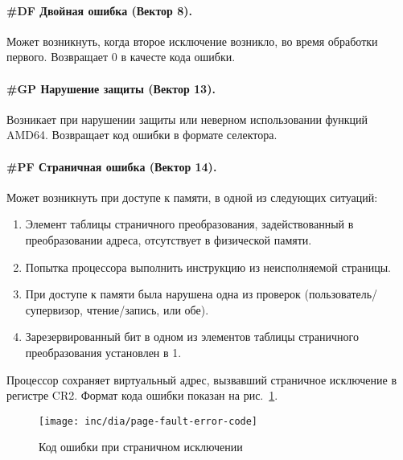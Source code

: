 \paragraph{\#DF Двойная ошибка (Вектор 8).}
Может возникнуть, когда второе исключение возникло, во время обработки
первого. Возвращает 0 в качесте кода ошибки.

\paragraph{\#GP Нарушение защиты (Вектор 13).}
Возникает при нарушении защиты или неверном использовании функций AMD64.
Возвращает код ошибки в формате селектора.

\paragraph{\#PF Страничная ошибка (Вектор 14).}
Может возникнуть при доступе к памяти, в одной из следующих ситуаций:
\begin{enumerate}[1.]
\item Элемент таблицы страничного преобразования, задействованный в
преобразовании адреса, отсутствует в физической памяти.
\item Попытка процессора выполнить инструкцию из неисполняемой страницы.
\item При доступе к памяти была нарушена одна из проверок
(пользователь/супервизор, чтение/запись, или обе).
\item Зарезервированный бит в одном из элементов таблицы страничного
преобразования установлен в 1.
\end{enumerate}

Процессор сохраняет виртуальный адрес, вызвавший страничное
исключение в регистре CR2. Формат кода ошибки показан на
рис.~\ref{fig:page_fault_error_code}.

\begin{figure}[ht!]
  \centering
  \texttt{[image: inc/dia/page-fault-error-code]}
  \caption{Код ошибки при страничном исключении}
  \label{fig:page_fault_error_code}
\end{figure}

